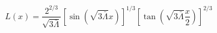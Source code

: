 \begin{equation}
L(x)=\frac{2^{2/3}}{\sqrt{3\bar\Lambda}}
[\sin(\sqrt{3\bar\Lambda} x)]^{1/3}[\tan(\sqrt{3\bar\Lambda}
\frac{x}{2})]^{2/3}
\label{NOL}
\end{equation}

